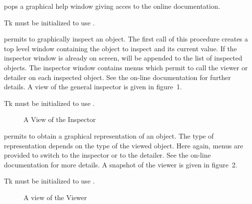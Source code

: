 \begin{entry}{%
}
\saut
\label{help}

 pops a graphical help window giving acces to the online
documentation.
\begin{note}
Tk must be initialized to use .
\end{note}
\end{entry}

\begin{entry}{%
}
\saut %
 permits to graphically inspect an object. The first call
of this procedure creates a top level window containing the object to
inspect and its current value. If the inspector window is already on
screen,  will be appended to the list of inspected objects.
The inspector window contains menus which permit to call the viewer or
detailer on each inspected object. See the on-line documentation for
further details. A view of the general inspector is given in figure~1.

\begin{note}
Tk must be initialized to use .
\end{note}

\begin{figure}
\centerline{}
\caption{A View of the Inspector}
\end{figure}
\end{entry}


\begin{entry}{%
}
\saut %
 permits to obtain a graphical representation of an {\stk}
object. The type of representation depends on the type of the viewed
object. Here again, menus are provided to switch to the inspector or
to the detailer. See the on-line documentation for more details. A
snapshot of the viewer is given in figure~2.

\begin{note}
Tk must be initialized to use .
\end{note}

\begin{figure}
\centerline{}
\caption{A view of the Viewer}
\end{figure}

\end{entry}



